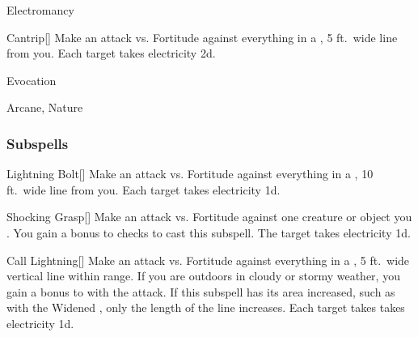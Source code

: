 \newpage
\begin{spellsection}{Electromancy}

\begin{spellheader}
\end{spellheader}


\begin{ability}{Cantrip}[]
Make an attack vs. Fortitude against everything in a \areamed, 5 ft.\ wide line from you.
\hit Each target takes electricity  \minus2d.
\end{ability}




 Evocation

 Arcane, Nature
\end{spellsection}


\subsubsection{Subspells}


\begin{ability}[\nth{1}]{Lightning Bolt}[]
Make an attack vs. Fortitude against everything in a \arealarge, 10 ft.\ wide line from you.
\hit Each target takes electricity  \minus1d.
\end{ability}
\vspace{0.25em}


\begin{ability}[\nth{1}]{Shocking Grasp}[]
Make an attack vs. Fortitude against one creature or object you .
You gain a  bonus to  checks to cast this subspell.
\hit The target takes electricity  \plus1d.
\end{ability}
\vspace{0.25em}


\begin{ability}[\nth{2}]{Call Lightning}[]
Make an attack vs. Fortitude against everything in a \arealarge, 5 ft.\ wide vertical line within \rngmed range.
If you are outdoors in cloudy or stormy weather, you gain a  bonus to  with the attack.
If this subspell has its area increased, such as with the Widened , only the length of the line increases.
\hit Each target takes takes electricity  \plus1d.
\end{ability}
\vspace{0.25em}



